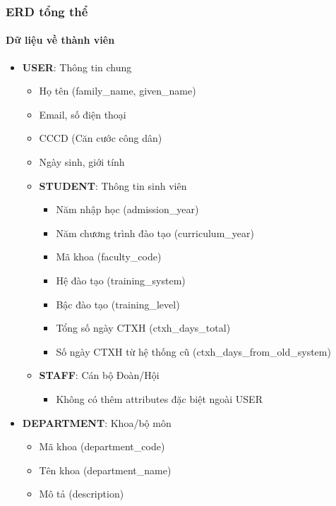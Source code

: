 \subsubsection{ERD tổng thể}
\paragraph{Dữ liệu về thành viên}

\begin{itemize}[leftmargin=*]
    \item \textbf{USER}: Thông tin chung
    \begin{itemize}
        \item Họ tên (family\_name, given\_name)
        \item Email, số điện thoại
        \item CCCD (Căn cước công dân)
        \item Ngày sinh, giới tính
    \end{itemize}
    
    \begin{itemize}
        \item \textbf{STUDENT}: Thông tin sinh viên
        \begin{itemize}
            \item Năm nhập học (admission\_year)
            \item Năm chương trình đào tạo (curriculum\_year)
            \item Mã khoa (faculty\_code)
            \item Hệ đào tạo (training\_system)
            \item Bậc đào tạo (training\_level)
            \item Tổng số ngày CTXH (ctxh\_days\_total)
            \item Số ngày CTXH từ hệ thống cũ (ctxh\_days\_from\_old\_system)
        \end{itemize}
        
        \item \textbf{STAFF}: Cán bộ Đoàn/Hội
        \begin{itemize}
            \item Không có thêm attributes đặc biệt ngoài USER
        \end{itemize}
    \end{itemize}
    
    \item \textbf{DEPARTMENT}: Khoa/bộ môn
    \begin{itemize}
        \item Mã khoa (department\_code)
        \item Tên khoa (department\_name)
        \item Mô tả (description)
    \end{itemize}
    

\end{itemize}

